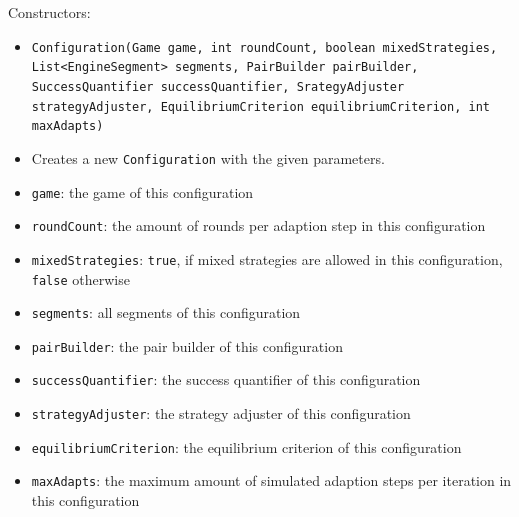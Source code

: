 \documentclass[parskip=full,11pt]{scrartcl}
\begin{document}
Constructors:
\begin{itemize}\itemsep -10pt
\item \texttt{Configuration(Game game, int roundCount, boolean mixedStrategies, List<EngineSegment> segments, PairBuilder pairBuilder, SuccessQuantifier successQuantifier, SrategyAdjuster strategyAdjuster, EquilibriumCriterion equilibriumCriterion, int maxAdapts)}
\item[] Creates a new \texttt{Configuration} with the given parameters.
\item[] \texttt{game}: the game of this configuration
\item[] \texttt{roundCount}: the amount of rounds per adaption step in this configuration
\item[] \texttt{mixedStrategies}: \texttt{true}, if mixed strategies are allowed in this configuration, \texttt{false} otherwise
\item[] \texttt{segments}: all segments of this configuration
\item[] \texttt{pairBuilder}: the pair builder of this configuration
\item[] \texttt{successQuantifier}: the success quantifier of this configuration
\item[] \texttt{strategyAdjuster}: the strategy adjuster of this configuration
\item[] \texttt{equilibriumCriterion}: the equilibrium criterion of this configuration
\item[] \texttt{maxAdapts}: the maximum amount of simulated adaption steps per iteration in this configuration
\end{itemize}
\end{document}
